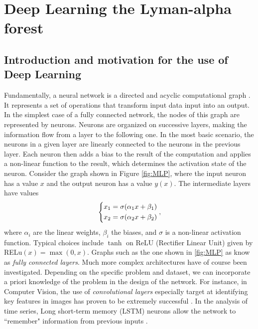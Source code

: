 \chapter{Deep Learning the Lyman-alpha forest}
\label{chap: deep learning}




\section{Introduction and motivation for the use of Deep Learning}
\label{sec:motiv_ml}


Fundamentally, a neural network is a directed and acyclic computational graph \cite{LeCun2015}. It represents a set of operations that transform input data input into an output. In the simplest case of a fully connected network, the nodes of this graph are represented by neurons. Neurons are organized on successive layers, making the information flow from a layer to the following one. In the most basic scenario, the neurons in a given layer are linearly connected to the neurons in the previous layer. Each neuron then adds a bias to the result of the computation and applies a non-linear function to the result, which determines the activation state of the neuron. Consider the graph shown in Figure \ref{fig:MLP}, where the input neuron has a value $x$ and the output neuron has a value $y(x)$. The intermediate layers have values
\begin{equation}
    \begin{dcases}
        x_1=\sigma(\alpha_1 x+\beta_1)\\
        x_2=\sigma(\alpha_2 x+\beta_2)
    \end{dcases},
\end{equation}
where $\alpha_i$ are the linear weights, $\beta_i$ the biases, and $\sigma$ is a non-linear activation function. Typical choices include $\tanh{}$ on ReLU (Rectifier Linear Unit) given by RELu$(x)=\max(0,x)$. Graphs such as the one shown in \cref{fig:MLP} as know as \emph{fully connected layers}. Much more complex architectures have of course been investigated. Depending on the specific problem and dataset, we can incorporate a priori knowledge of the problem in the design of the network. For instance, in Computer Vision, the use of \emph{convolutional layers} especially target at identifying key features in images has proven to be extremely successful \cite{CNN_rev}. In the analysis of time series, Long short-term memory (LSTM) neurons allow the network to ``remember" information from previous inputs \cite{LSTM_rev}. 




